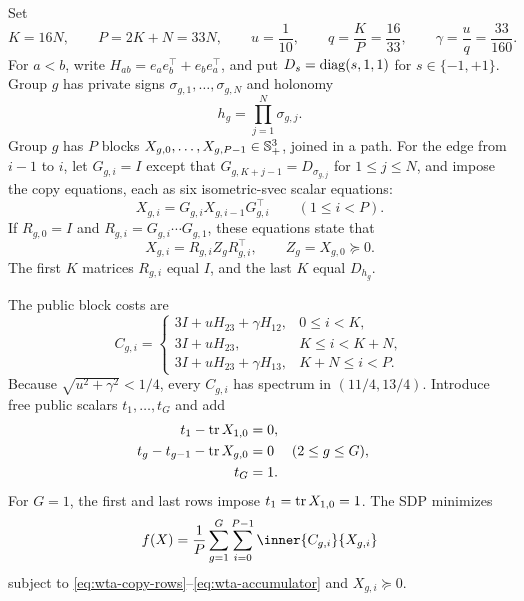 Set
\begin{equation}
 K=16N,\qquad P=2K+N=33N,
 \qquad u=\frac1{10},\qquad q=\frac KP=\frac{16}{33},
 \qquad \gamma=\frac uq=\frac{33}{160}.
 \label{eq:wta-parameters}
\end{equation}
For $a<b$, write $H_{ab}=e_ae_b^\top+e_be_a^\top$, and put
$D_s=\operatorname{diag}(s,1,1)$ for $s\in\{-1,+1\}$.  Group $g$ has private signs
$\sigma_{g,1},\ldots,\sigma_{g,N}$ and holonomy
\begin{equation}
 h_g=\prod_{j=1}^N\sigma_{g,j}.
 \label{eq:wta-holonomy}
\end{equation}
Group $g$ has $P$ blocks $X_{g,0},\ldots,X_{g,P-1}\in\mathbb{S}_{+}^3$, joined in a
path.  For the edge from $i-1$ to $i$, let $G_{g,i}=I$ except that
$G_{g,K+j-1}=D_{\sigma_{g,j}}$ for $1\le j\le N$, and impose the copy
equations, each as six isometric-svec scalar equations:
\begin{equation}
 X_{g,i}=G_{g,i}X_{g,i-1}G_{g,i}^\top
 \qquad(1\le i<P).
 \label{eq:wta-copy-rows}
\end{equation}
If $R_{g,0}=I$ and $R_{g,i}=G_{g,i}\cdots G_{g,1}$, these equations state that
\begin{equation}
 X_{g,i}=R_{g,i}Z_gR_{g,i}^\top,\qquad Z_g=X_{g,0}\succeq0.
 \label{eq:wta-root-lift}
\end{equation}
The first $K$ matrices $R_{g,i}$ equal $I$, and the last $K$ equal
$D_{h_g}$.

The public block costs are
\begin{equation}
 C_{g,i}=\begin{cases}
 3I+uH_{23}+\gamma H_{12},&0\le i<K,\\
 3I+uH_{23},&K\le i<K+N,\\
 3I+uH_{23}+\gamma H_{13},&K+N\le i<P.
 \end{cases}
 \label{eq:wta-local-costs}
\end{equation}
Because $\sqrt{u^2+\gamma^2}<1/4$, every $C_{g,i}$ has spectrum in
$(11/4,13/4)$.  Introduce free public scalars $t_1,\ldots,t_G$ and add
\begin{align}
 t_1-\operatorname{tr} X_{1,0}&=0,\nonumber\\
 t_g-t_{g-1}-\operatorname{tr} X_{g,0}&=0 &&(2\le g\le G),\nonumber\\
 t_G&=1. \label{eq:wta-accumulator}
\end{align}
For $G=1$, the first and last rows impose $t_1=\operatorname{tr} X_{1,0}=1$.
The SDP minimizes
\begin{equation}
 f(X)=\frac1P\sum_{g=1}^G\sum_{i=0}^{P-1}
                  \inner{C_{g,i}}{X_{g,i}}
 \label{eq:wta-objective}
\end{equation}
subject to \eqref{eq:wta-copy-rows}--\eqref{eq:wta-accumulator} and
$X_{g,i}\succeq0$.

